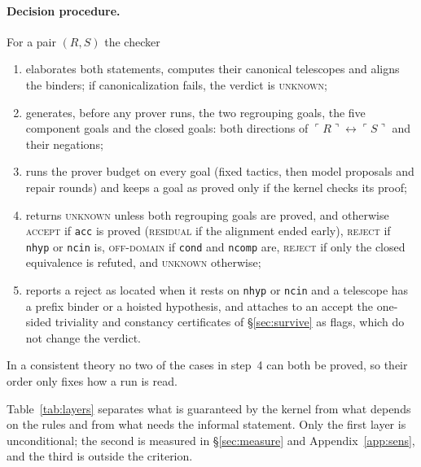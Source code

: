\documentclass[10pt]{article}
\theoremstyle{definition}
\newcommand{\Cl}[1]{\ulcorner #1 \urcorner}
\newcommand{\V}[1]{\textsc{#1}}
\begin{document}
\paragraph{Decision procedure.} For a pair $(R,S)$ the checker
\begin{enumerate}\setlength{\itemsep}{0pt}
\item elaborates both statements, computes their canonical telescopes and aligns the binders; if
canonicalization fails, the verdict is \V{unknown};
\item generates, before any prover runs, the two regrouping goals, the five component goals and
the closed goals: both directions of $\Cl R\leftrightarrow\Cl S$ and their negations;
\item runs the prover budget on every goal (fixed tactics, then model proposals and repair
rounds) and keeps a goal as proved only if the kernel checks its proof;
\item returns \V{unknown} unless both regrouping goals are proved, and otherwise \V{accept} if
\texttt{acc} is proved (\V{residual} if the alignment ended early), \V{reject} if \texttt{nhyp} or
\texttt{ncin} is, \V{off-domain} if \texttt{cond} and \texttt{ncomp} are, \V{reject} if only the
closed equivalence is refuted, and \V{unknown} otherwise;
\item reports a reject as located when it rests on \texttt{nhyp} or \texttt{ncin} and a telescope
has a prefix binder or a hoisted hypothesis, and attaches to an accept the one-sided triviality
and constancy certificates of \S\ref{sec:survive} as flags, which do not change the verdict.
\end{enumerate}
In a consistent theory no two of the cases in step~4 can both be proved, so their order only
fixes how a run is read.

Table~\ref{tab:layers} separates what is guaranteed by the kernel from what depends on the rules
and from what needs the informal statement. Only the first layer is unconditional; the second is
measured in \S\ref{sec:measure} and Appendix~\ref{app:sens}, and the third is outside the
criterion.
\end{document}

